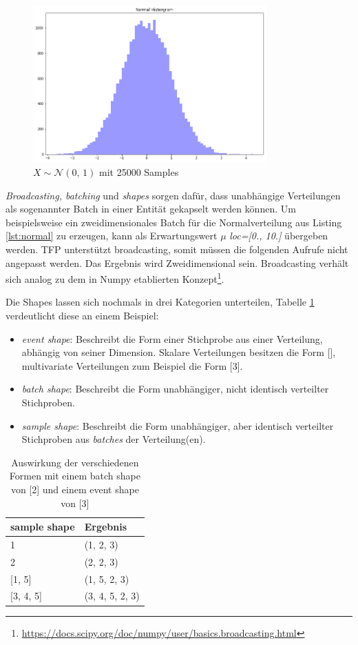 \documentclass[12pt]{article}
\begin{document}
\begin{figure}[h]
    \centering
    \includegraphics[width=0.8\textwidth]{./figs/normal-dist.png}
    \caption{$X \sim \mathcal{N}(0,\, 1)$ mit 25000 Samples}
    \label{fig:normal_dist}
\end{figure}

\textit{Broadcasting, batching} und \textit{shapes} sorgen dafür, dass unabhängige Verteilungen als sogenannter Batch in einer Entität  gekapselt werden können. Um beispielsweise ein zweidimensionales Batch für die Normalverteilung aus Listing \ref{lst:normal} zu erzeugen, kann als Erwartungswert $\mu$ \textit{loc=[0., 10.]} übergeben werden. TFP unterstützt broadcasting, somit müssen die folgenden Aufrufe nicht angepasst werden. Das Ergebnis wird Zweidimensional sein. Broadcasting verhält sich analog zu dem in Numpy etablierten Konzept\footnote{\url{https://docs.scipy.org/doc/numpy/user/basics.broadcasting.html}}.

Die Shapes lassen sich nochmals in drei Kategorien unterteilen, Tabelle \ref{table:shapes} verdeutlicht diese an einem Beispiel:
\begin{itemize}
  \item \textit{event shape}: Beschreibt die Form einer Stichprobe aus einer Verteilung, abhängig von seiner Dimension. Skalare Verteilungen besitzen die Form [], multivariate Verteilungen zum Beispiel die Form [3].
  \item \textit{batch shape}: Beschreibt die Form unabhängiger, nicht identisch verteilter Stichproben.
  \item \textit{sample shape}: Beschreibt die Form unabhängiger, aber identisch verteilter Stichproben aus \textit{batches} der Verteilung(en).
\end{itemize}

\begin{table}[]
\centering
\begin{tabular}{|l|l|}
\hline
sample shape  & Ergebnis        \\ \hline
1             & (1, 2, 3)       \\ \hline
2             & (2, 2, 3)       \\ \hline
{[}1, 5{]}    & (1, 5, 2, 3)    \\ \hline
{[}3, 4, 5{]} & (3, 4, 5, 2, 3) \\ \hline
\end{tabular}
\caption{Auswirkung der verschiedenen Formen mit einem batch shape von [2] und einem event shape von [3]}
\label{table:shapes}
\end{table}
\end{document}

